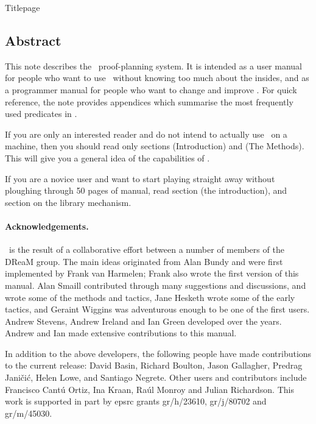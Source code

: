 \def\rcsid{$Id: manual.tex,v 1.30 1999/04/30 14:42:32 img Exp $}

\expandafter\gdef\csname dofooter\endcsname{}

\thispagestyle{empty}
\pagestyle{empty}

   {Titlepage}
\subsection* {Abstract}
This note describes the \clam\ proof-planning system. It is intended
as a user manual for people who want to use \clam\ without knowing too
much about the insides, and as a programmer manual for people who want
to change and improve \clam. For quick reference, the note provides
appendices which summarise the most frequently used predicates in
\clam.


If you are only an interested reader and do not intend to actually use
\clam\ on a machine, then you should read only sections
 (Introduction) and  (The
Methods). This will give you a general idea of the capabilities of
\clam.

If you are a novice user and want to start playing straight away
without ploughing through 50 pages of manual, read section
 (the introduction), and section  on
the library mechanism.


\paragraph {Acknowledgements.}  \clam\ is the result of a
collaborative effort between a number of members of the DReaM
group. The main ideas originated from Alan Bundy and were first
implemented by Frank van Harmelen;  Frank also wrote the first version
of this manual.  Alan Smaill contributed through
many suggestions and discussions, and wrote some of the methods and
tactics, Jane Hesketh wrote some of the early tactics, and Geraint
Wiggins was adventurous enough to be one of the first users.   Andrew
Stevens, Andrew Ireland and Ian Green developed \clam over the years.
Andrew and Ian made extensive contributions to this manual.

In addition to the above developers, the following people have made
contributions to the current \clam release: David Basin, Richard
Boulton, Jason Gallagher, Predrag Jani\v{c}i\'c, Helen Lowe, and
Santiago Negrete.  Other users and contributors include Francisco
Cant\'u Ortiz, Ina Kraan, Ra\'ul Monroy and Julian Richardson.  This
work is supported in part by {\sc epsrc} grants {\sc gr/h/23610}, {\sc
gr/j/80702} and {\sc gr/m/45030}.


